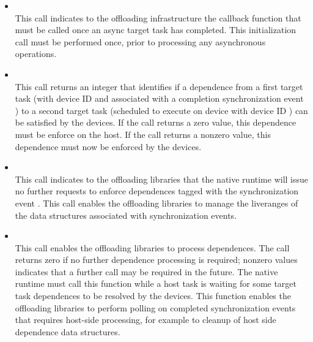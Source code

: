 \begin{itemize}
  \item {} \\
  
  This call indicates to the offloading infrastructure the callback function that must be called once an async target task has completed. This initialization call must be performed once, prior to processing any asynchronous operations.
  
  \item {} \\
  
  This call returns an integer that identifies if a dependence from a first target task (with device ID  and associated with a completion synchronization event ) to a second target task (scheduled to execute on device with device ID ) can be satisfied by the devices. If the call returns a zero value, this dependence must be enforce on the host. If the call returns a nonzero value, this dependence must now be enforced by the devices.
    
  \item {} \\
  
  This call indicates to the offloading libraries that the native runtime will issue no further requests to enforce dependences tagged with the synchronization event . This call enables the offloading libraries to manage the liveranges of the data structures associated with synchronization events. 
  
  \item {} \\
  
 This call enables the offloading libraries to process dependences. The call returns zero if no further dependence processing is required; nonzero values indicates that a further call may be required in the future. The native runtime must call this function while a host task is waiting for some target task dependences to be resolved by the devices. This function enables the offloading libraries to perform polling on completed synchronization events that requires host-side processing, for example to cleanup of host side dependence data structures. 
 \end{itemize}
  
